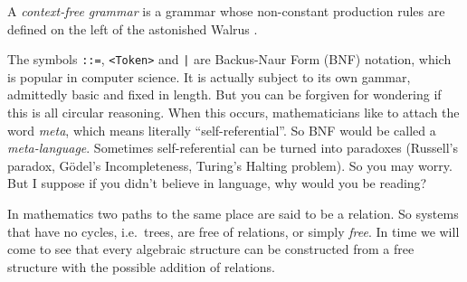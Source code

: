 \begin{definition}
    A \emph{context-free grammar} is a grammar whose non-constant 
    production rules are defined on the left of the astonished Walrus 
    \code{::=}.
\end{definition}

\begin{remark}
    The symbols \lstinline{::=}, \lstinline{<Token>} and \lstinline{|} are 
    Backus-Naur Form (BNF) notation, which is popular 
    in computer science.  It is actually subject to its own gammar, admittedly 
    basic and fixed in length.  But you can be forgiven for wondering if this is 
    all circular reasoning.  When this occurs, mathematicians like to attach 
    the word \emph{meta}, which means literally ``self-referential''.
    So BNF would be called a \emph{meta-language}. Sometimes self-referential 
    can be turned into paradoxes (Russell's paradox, G\"odel's Incompleteness,
    Turing's Halting problem).  So you may worry.  But I suppose if you 
    didn't believe in language, why would you be reading?\\
\end{remark}


In mathematics two paths to the same place are said to be a relation.  So
systems that have no cycles, i.e.\ trees, are free of relations, or simply
\emph{free}.  In time we will come to see that every algebraic structure can be
constructed from a free structure with the possible addition of relations.

